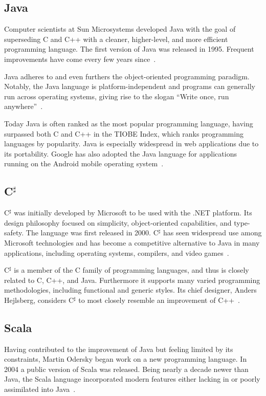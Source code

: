 \documentclass{article}
\begin{document}
\subsection{Java}

Computer scientists at Sun Microsystems developed Java with the goal of superseding C and C++ with a cleaner, higher-level, and more efficient programming language. The first version of Java was released in 1995. Frequent improvements have come every few years since~\cite{java1}.

Java adheres to and even furthers the object-oriented programming paradigm. Notably, the Java language is platform-independent and programs can generally run across operating systems, giving rise to the slogan ``Write once, run anywhere''~\cite{java2}.

Today Java is often ranked as the most popular programming language, having surpassed both C and C++ in the TIOBE Index, which ranks programming languages by popularity. Java is especially widespread in web applications due to its portability. Google has also adopted the Java language for applications running on the Android mobile operating system~\cite{tiobe1}.

\subsection{C$^\sharp$}

C$^\sharp$ was initially developed by Microsoft to be used with the .NET platform. Its design philosophy focused on simplicity, object-oriented capabilities, and type-safety. The language was first released in 2000. C$^\sharp$ has seen widespread use among Microsoft technologies and has become a competitive alternative to Java in many applications, including operating systems, compilers, and video games~\cite{csharp1}.

C$^\sharp$ is a member of the C family of programming languages, and thus is closely related to C, C++, and Java. Furthermore it supports many varied programming methodologies, including functional and generic styles. Its chief designer, Anders Hejlsberg, considers C$^\sharp$ to most closely resemble an improvement of C++~\cite{csharp2}.

\subsection{Scala}

Having contributed to the improvement of Java but feeling limited by its constraints, Martin Odersky began work on a new programming language. In 2004 a public version of Scala was released. Being nearly a decade newer than Java, the Scala language incorporated modern features either lacking in or poorly assimilated into Java~\cite{scala1}.
\end{document}
